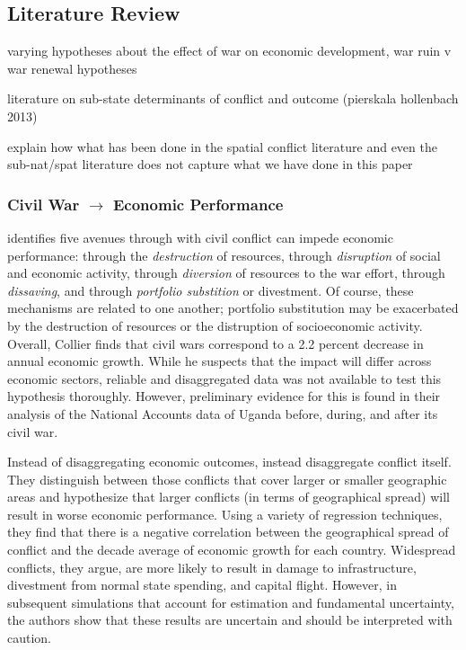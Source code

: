 \subsection{Literature Review}
\label{lit}

varying hypotheses about the effect of war on economic development, war ruin v war renewal hypotheses

literature on sub-state determinants of conflict and outcome (pierskala hollenbach 2013)

	explain how what has been done in the spatial conflict literature and even the sub-nat/spat literature does not capture what we have done in this paper



\subsubsection{Civil War $\rightarrow$ Economic Performance}

\cite{collier:1999} identifies five avenues through with civil conflict can impede economic performance: through the \textit{destruction} of resources, through \textit{disruption} of social and economic activity, through \textit{diversion} of resources to the war effort, through \textit{dissaving}, and through \textit{portfolio substition} or divestment.  Of course, these mechanisms are related to one another; portfolio substitution may be exacerbated by the destruction of resources or the distruption of socioeconomic activity.  Overall, Collier finds that civil wars correspond to a 2.2 percent decrease in annual economic growth.  While he suspects that the impact will differ across economic sectors, reliable and disaggregated data was not available to test this hypothesis thoroughly.  However, preliminary evidence for this is found in their analysis of the National Accounts data of Uganda before, during, and after its civil war.

Instead of disaggregating economic outcomes, \cite{imai:weinstein:2000} instead disaggregate conflict itself.  They distinguish between those conflicts that cover larger or smaller geographic areas and hypothesize that larger conflicts (in terms of geographical spread) will result in worse economic performance.  Using a variety of regression techniques, they find that there is a negative correlation between the geographical spread of conflict and the decade average of economic growth for each country.  Widespread conflicts, they argue, are more likely to result in damage to infrastructure, divestment from normal state spending, and capital flight.  However, in subsequent simulations that account for estimation and fundamental uncertainty, the authors show that these results are uncertain and should be interpreted with caution.

